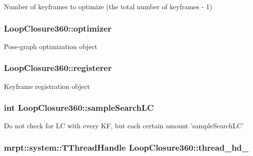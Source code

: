 Number of keyframes to optimize (the total number of keyframes -\/ 1) \hypertarget{classLoopClosure360_a3cd0c08e2bb1a4588634aa4a2ca203a9}{
\subsubsection[{optimizer}]{ Loop\-Closure360\-::optimizer\hspace{0.3cm}{\ttfamily [private]}}}\label{classLoopClosure360_a3cd0c08e2bb1a4588634aa4a2ca203a9}
Pose-\/graph optimization object \hypertarget{classLoopClosure360_a1002d38ebe9e93238e8260096d85d87f}{
\subsubsection[{registerer}]{ Loop\-Closure360\-::registerer\hspace{0.3cm}{\ttfamily [private]}}}\label{classLoopClosure360_a1002d38ebe9e93238e8260096d85d87f}
Keyframe registration object \hypertarget{classLoopClosure360_ab3ba4c9b0ccab41b5a93c4e61645df7f}{
\subsubsection[{sample\-Search\-L\-C}]{\setlength{\rightskip}{0pt plus 5cm}int Loop\-Closure360\-::sample\-Search\-L\-C\hspace{0.3cm}{\ttfamily [private]}}}\label{classLoopClosure360_ab3ba4c9b0ccab41b5a93c4e61645df7f}
Do not check for L\-C with every K\-F, but each certain amount 'sample\-Search\-L\-C' \hypertarget{classLoopClosure360_aff328ff138b4a58ca1efaf212e1c3606}{
\subsubsection[{thread\-\_\-hd\-\_\-}]{\setlength{\rightskip}{0pt plus 5cm}mrpt\-::system\-::\-T\-Thread\-Handle Loop\-Closure360\-::thread\-\_\-hd\-\_\-\hspace{0.3cm}{\ttfamily [private]}}}\label{classLoopClosure360_aff328ff138b4a58ca1efaf212e1c3606}
